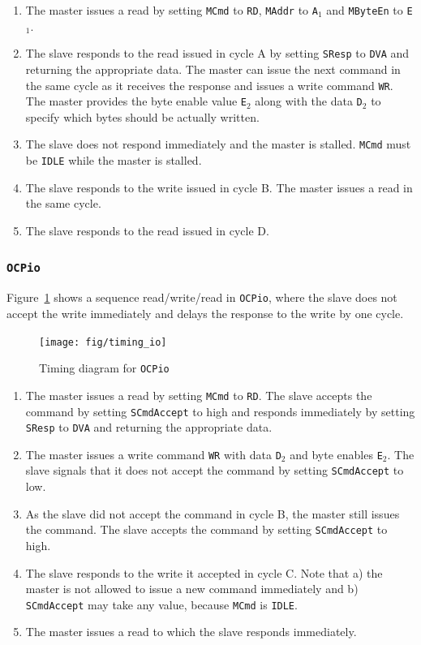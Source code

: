 \documentclass[a4paper,fontsize=10pt,twoside,DIV15,BCOR12mm,headinclude=true,footinclude=false,pagesize,bibtotoc]{scrbook}
\newcommand{\code}[1]{{\texttt{#1}}}
\begin{document}
\begin{enumerate}[A:]
\item The master issues a read by setting \code{MCmd} to \code{RD},
  \code{MAddr} to \code{A$_1$} and \code{MByteEn} to \code{E$_1$}.
\item The slave responds to the read issued in cycle A by setting
  \code{SResp} to \code{DVA} and returning the appropriate data. The
  master can issue the next command in the same cycle as it receives
  the response and issues a write command \code{WR}. The
  master provides the byte enable value \code{E$_2$} along with the
  data \code{D$_2$} to specify which bytes should be actually written.
\item The slave does not respond immediately and the master is
  stalled. \code{MCmd} must be \code{IDLE} while the master is
  stalled.
\item The slave responds to the write issued in cycle B. The master
  issues a read in the same cycle.
\item The slave responds to the read issued in cycle D.
\end{enumerate}

\clearpage
\subsubsection{\code{OCPio}}

Figure~\ref{fig:timing_io} shows a sequence read/write/read in
\code{OCPio}, where the slave does not accept the write immediately
and delays the response to the write by one cycle.

\begin{figure}
\centering
\texttt{[image: fig/timing\_io]}
\caption{Timing diagram for \code{OCPio}}
\label{fig:timing_io}
\end{figure}

\begin{enumerate}[A:]
\item The master issues a read by setting \code{MCmd} to
  \code{RD}. The slave accepts the command by setting
  \code{SCmdAccept} to high and responds immediately by setting
  \code{SResp} to \code{DVA} and returning the appropriate data.
\item The master issues a write command \code{WR} with
  data \code{D$_2$} and byte enables \code{E$_2$}. The slave
  signals that it does not accept the command by setting
  \code{SCmdAccept} to low.
\item As the slave did not accept the command in cycle B, the master
  still issues the command. The slave accepts the command by setting
  \code{SCmdAccept} to high.
\item The slave responds to the write it accepted in cycle C. Note
  that a) the master is not allowed to issue a new command immediately
  and b) \code{SCmdAccept} may take any value, because \code{MCmd} is
  \code{IDLE}.
\item The master issues a read to which the slave responds immediately.
\end{enumerate}
\end{document}
